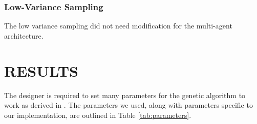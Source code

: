 \documentclass[letterpaper, 10 pt, conference]{ieeeconf}  %
\begin{document}
\subsubsection{Low-Variance Sampling}
The low variance sampling did not need modification for the multi-agent architecture.

\section{RESULTS}\label{results}
The designer is required to set many parameters for the genetic algorithm to work as derived in \cite{Parkinson2019}. The parameters we used, along with parameters specific to our implementation, are outlined in Table \ref{tab:parameters}.
\end{document}
